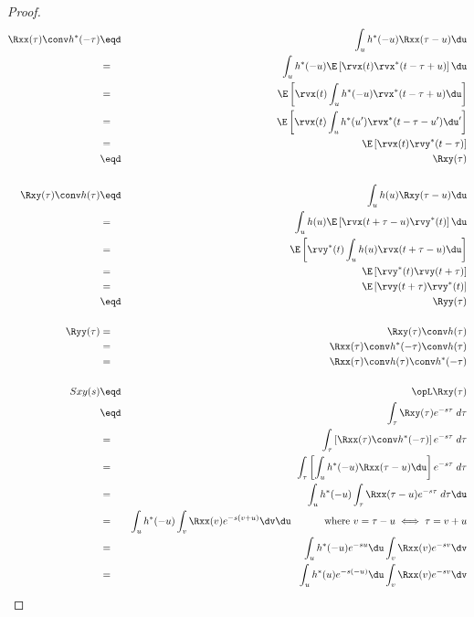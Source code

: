 \begin{proof}
\begin{eqnarray*}
   \Rxx(\tau) \conv h^\ast(-\tau)
     &\eqd& \int_u h^\ast(-u) \Rxx(\tau-u)\du
   \\&=&    \int_u h^\ast(-u) \E\left[\rvx(t) \rvx^\ast(t-\tau+u) \right] \du
   \\&=&    \E\left[\rvx(t) \int_u h^\ast(-u)  \rvx^\ast(t-\tau+u) \du   \right]
   \\&=&    \E\left[\rvx(t) \int_u h^\ast(u^\prime)  \rvx^\ast(t-\tau-u^\prime) \du^\prime   \right]
   \\&=&    \E\left[\rvx(t) \rvy^\ast(t-\tau)  \right]
   \\&\eqd& \Rxy(\tau)
\\
\\
   \Rxy(\tau) \conv h(\tau)
     &\eqd& \int_u h(u) \Rxy(\tau-u)\du
   \\&=&    \int_u h(u) \E\left[\rvx(t+\tau-u) \rvy^\ast(t) \right] \du
   \\&=&    \E\left[\rvy^\ast(t) \int_u h(u) \rvx(t+\tau-u)  \du \right]
   \\&=&    \E\left[\rvy^\ast(t) \rvy(t+\tau) \right]
   \\&=&    \E\left[ \rvy(t+\tau) \rvy^\ast(t)\right]
   \\&\eqd& \Ryy(\tau)
\\
\\
   \Ryy(\tau)
     &=& \Rxy(\tau) \conv h(\tau)
   \\&=& \Rxx(\tau) \conv h^\ast(-\tau) \conv h(\tau)
   \\&=& \Rxx(\tau) \conv h(\tau)  \conv h^\ast(-\tau)
\\
\\
   Sxy(s)
     &\eqd& \opL \Rxy(\tau)
   \\&\eqd& \int_\tau \Rxy(\tau) e^{-s\tau} \; d\tau
   \\&=&    \int_\tau \left[ \Rxx(\tau) \conv h^\ast(-\tau) \right] e^{-s\tau} \; d\tau
   \\&=&    \int_\tau \left[ \int_u h^\ast(-u) \Rxx(\tau-u)\du \right] e^{-s\tau} \; d\tau
   \\&=&    \int_u h^\ast(-u) \int_\tau \Rxx(\tau-u)e^{-s\tau} \; d\tau\du
   \\&=&    \int_u h^\ast(-u) \int_v \Rxx(v)e^{-s(v+u)} \dv \du
            \hspace{3em}\mbox{ where $v=\tau-u\iff \tau=v+u$}
   \\&=&    \int_u h^\ast(-u) e^{-su} \du \int_v \Rxx(v)e^{-sv} \dv
   \\&=&    \int_u h^\ast(u) e^{-s(-u)} \du \int_v \Rxx(v)e^{-sv} \dv

\end{eqnarray*}
\end{proof}
